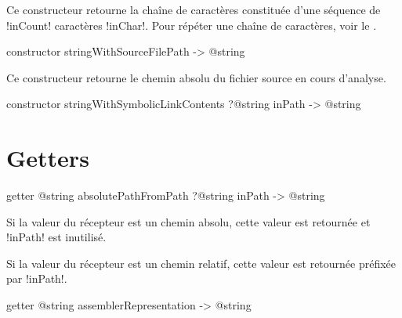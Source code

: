 Ce constructeur retourne la chaîne de caractères constituée d'une séquence de \ggs!inCount! caractères \ggs!inChar!. Pour répéter une chaîne de caractères, voir le .






\begin{galgasbox}
constructor stringWithSourceFilePath -> @string
\end{galgasbox}

Ce constructeur retourne le chemin absolu du fichier source en cours d'analyse.







\begin{galgasbox}
constructor stringWithSymbolicLinkContents ?@string inPath -> @string
\end{galgasbox}



















\section{Getters}



\begin{galgasbox}
getter @string absolutePathFromPath ?@string inPath -> @string
\end{galgasbox}

Si la valeur du récepteur est un chemin absolu, cette valeur est retournée et \ggs!inPath! est inutilisé.

Si la valeur du récepteur est un chemin relatif, cette valeur est retournée préfixée par \ggs!inPath!.





\begin{galgasbox}
getter @string assemblerRepresentation -> @string
\end{galgasbox}

